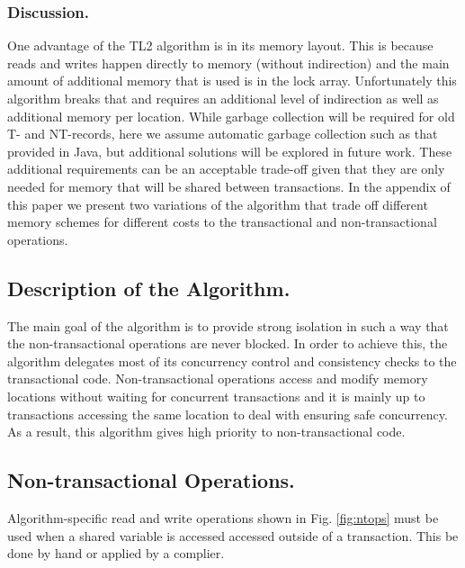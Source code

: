 \subsubsection{Discussion.}
One advantage of the TL2 algorithm is in its memory layout.
This is because reads and writes happen directly to memory (without indirection)
and the main amount of additional memory that is used is in the lock array.
Unfortunately this algorithm breaks that and requires an additional level of indirection
as well as additional memory per location.
While garbage collection will be required for old T- and NT-records, here we assume
automatic garbage collection such as that provided in Java, but additional solutions will be explored in future work.
These additional requirements can be an acceptable trade-off given that they are only
needed for memory that will be shared between transactions.
In the appendix of this paper we present two variations of the algorithm that trade
off different memory schemes for different costs to the transactional and
non-transactional operations.



\subsection{Description of the Algorithm.}

The main goal of the algorithm is to provide strong isolation 
in such a way that  the non-transactional  operations are never blocked. 
In order  to achieve this,  the algorithm delegates most of its
concurrency   control   and  consistency   checks   to  the   transactional
code. Non-transactional  
operations access and modify  memory  locations without waiting for concurrent transactions
 and it is mainly up to transactions accessing the same location to
deal with ensuring safe concurrency.  As a
result, this algorithm gives high  priority   to non-transactional code. 

\subsection{Non-transactional Operations.}
Algorithm-specific  read  and write operations
shown in Fig. \ref{fig:ntops} must be used when a shared variable is accessed
accessed outside of a transaction.  This be done by hand or applied by a complier. 

